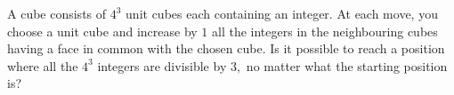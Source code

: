 A cube consists of $4^3$ unit cubes each containing an integer. At each move, you choose a unit cube and increase by $1$ all the integers in the neighbouring cubes having a face in common with the chosen cube. Is it possible to reach a position where all the $4^3$ integers are divisible by $3,$ no matter what the starting position is?